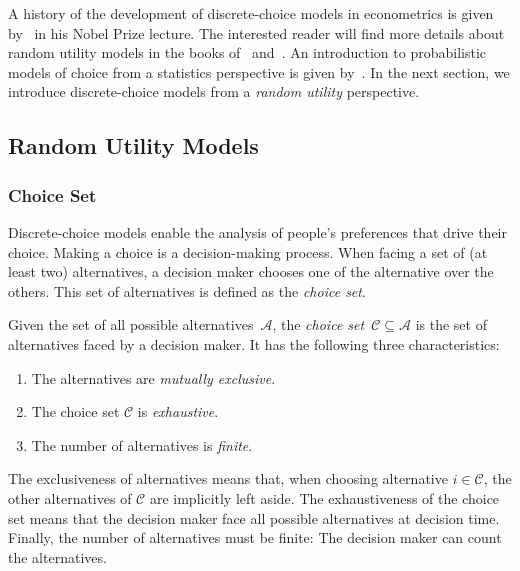 A history of the development of discrete-choice models in econometrics is given by~\citet{mcfadden2001economic} in his Nobel Prize lecture.
The interested reader will find more details about random utility models in the books of~\citet[Chapter~1]{train2009discrete} and~\citet[Chapter~3]{hensher2005applied}.
An introduction to probabilistic models of choice from a statistics perspective is given by~\citet[Chapter~1]{maystre2018efficient}.
In the next section, we introduce discrete-choice models from a \emph{random utility} perspective.

\subsection{Random Utility Models}

\subsubsection{Choice Set}
Discrete-choice models enable the analysis of people's preferences that drive their choice.
Making a choice is a decision-making process.
When facing a set of (at least two) alternatives, a decision maker chooses one of the alternative over the others.
This set of alternatives is defined as the \emph{choice set}.

\begin{definition}
  Given the set of all possible alternatives~$\mathcal{A}$, the \emph{choice set}~$\mathcal{C} \subseteq \mathcal{A}$ is the set of alternatives faced by a decision maker.
  It has the following three characteristics:
  \begin{enumerate}
    \item The alternatives are \emph{mutually exclusive}.
    \item The choice set $\mathcal{C}$ is \emph{exhaustive}.
    \item The number of alternatives is \emph{finite}.
  \end{enumerate}
\end{definition}

The exclusiveness of alternatives means that, when choosing alternative $i \in \mathcal{C}$, the other alternatives of $\mathcal{C}$ are implicitly left aside.
The exhaustiveness of the choice set means that the decision maker face all possible alternatives at decision time.
Finally, the number of alternatives must be finite:
The decision maker can count the alternatives.

